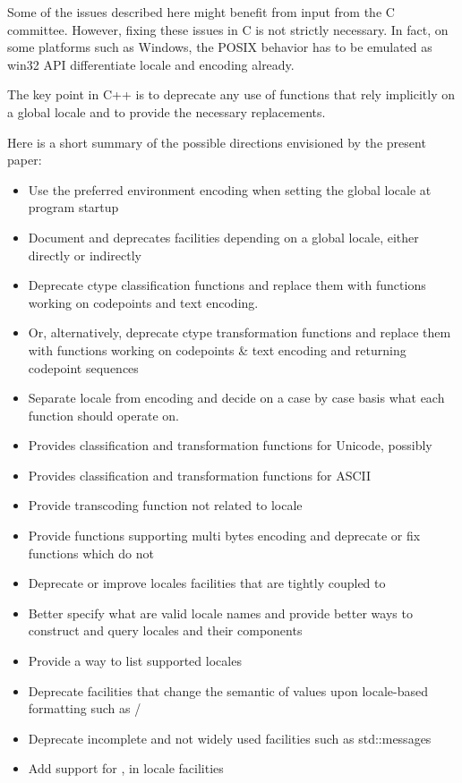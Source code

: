 \documentclass{wg21}
\begin{document}
Some of the issues described here might benefit from input from the C committee.
However, fixing these issues in C is not strictly necessary.
In fact, on some platforms such as Windows, the POSIX behavior has to be emulated as win32 API differentiate locale and encoding already. 

The key point in C++ is to deprecate any use of functions that rely implicitly on a global locale and to provide the necessary replacements.

Here is a short summary of the possible directions envisioned by the present paper:

\begin{itemize}
\item Use the preferred environment encoding when setting the global  locale at program startup
\item Document and deprecates facilities depending on a global locale, either directly or indirectly
\item Deprecate ctype classification functions and replace them with functions working on codepoints and text encoding.
\item Or, alternatively, deprecate ctype transformation functions and replace them with functions working on codepoints \& text encoding and returning codepoint sequences
\item Separate locale from encoding and decide on a case by case basis what each function should operate on.
\item Provides classification and transformation functions for Unicode, possibly 
\item Provides  classification and transformation functions for ASCII
\item Provide transcoding function not related to locale
\item Provide functions supporting multi bytes encoding and deprecate or fix functions which do not
\item Deprecate or improve locales facilities that are tightly coupled to 
\item Better specify what are valid locale names and provide better ways to construct and query locales and their components
\item Provide a way to list supported locales
\item Deprecate facilities that change the semantic of values upon locale-based formatting such as /
\item Deprecate incomplete and not widely used facilities such as std::messages
\item Add support for ,  in locale facilities
\end{itemize}
\end{document}
